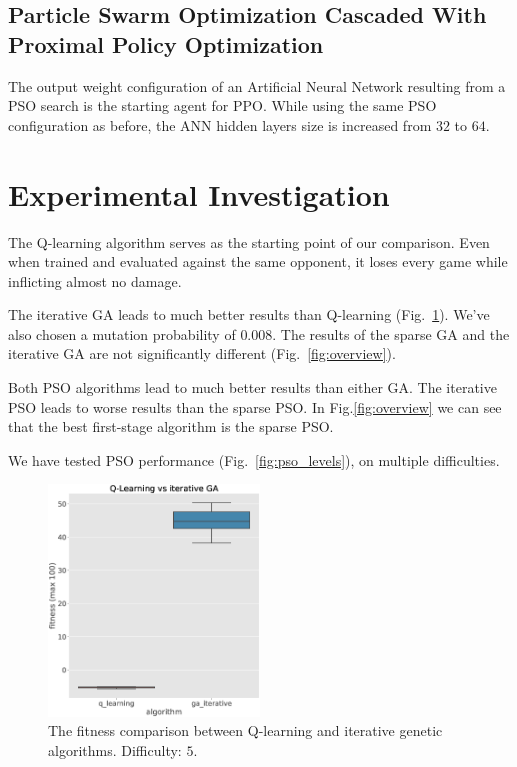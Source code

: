 \documentclass[conference]{IEEEtran}
\begin{document}
    \subsection{Particle Swarm Optimization Cascaded With Proximal Policy Optimization}\label{subsec:particle-swarm-optimization-cascaded-with-proximal-policy-optimization}
    The output weight configuration of an Artificial Neural Network resulting from a PSO search is the starting agent for PPO\@.
    While using the same PSO configuration as before, the ANN hidden layers size is increased from $32$ to $64$.
    
    \section{Experimental Investigation}\label{sec:experimental-investigation}

    The Q-learning algorithm serves as the starting point of our comparison.
    Even when trained and evaluated against the same opponent, it loses every game
    while inflicting almost no damage.

    The iterative GA leads to much better results than Q-learning (Fig.~\ref{fig:q_vs_ga_iterative}).
    We've also chosen a mutation probability of $0.008$. The results of the sparse GA and the iterative GA
    are not significantly different (Fig.~\ref{fig:overview}).

    Both PSO algorithms lead to much better results than either GA.
    The iterative PSO leads to worse results than the sparse PSO\@.
    In Fig.\ref{fig:overview} we can see that the best first-stage algorithm is the sparse PSO\@.
    
    We have tested PSO performance (Fig.~\ref{fig:pso_levels}), on multiple difficulties.

    
    \begin{figure}[!ht]
        \centering
        \includegraphics[width=0.5\textwidth]{old_images/q_vs_ga_iterative.eps}
        \caption{The fitness comparison between Q-learning and iterative genetic algorithms. Difficulty: $5$.}
        \label{fig:q_vs_ga_iterative}
    \end{figure}
      
\end{document}

